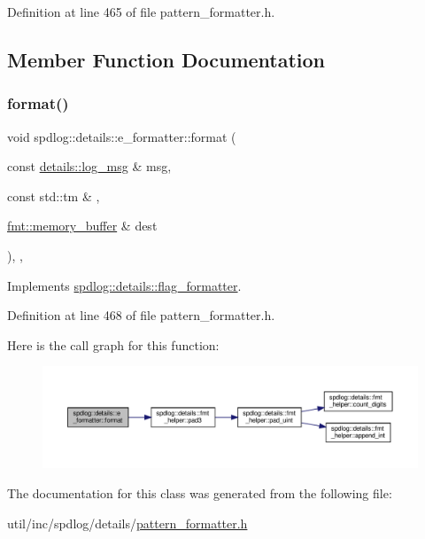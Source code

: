 Definition at line 465 of file pattern\+\_\+formatter.\+h.



\subsection{Member Function Documentation}
\mbox{\label{classspdlog_1_1details_1_1e__formatter_a931a5482cce50c580dd4e570fd27e976}} 
\subsubsection{\texorpdfstring{format()}{format()}}
{\footnotesize\ttfamily void spdlog\+::details\+::e\+\_\+formatter\+::format (\begin{DoxyParamCaption}\item[{const \hyperlink{structspdlog_1_1details_1_1log__msg}{details\+::log\+\_\+msg} \&}]{msg,  }\item[{const std\+::tm \&}]{,  }\item[{\hyperlink{format_8h_a21cbf729f69302f578e6db21c5e9e0d2}{fmt\+::memory\+\_\+buffer} \&}]{dest }\end{DoxyParamCaption})\hspace{0.3cm}{\ttfamily [inline]}, {\ttfamily [override]}, {\ttfamily [virtual]}}



Implements \hyperlink{classspdlog_1_1details_1_1flag__formatter_a33fb3e42a4c8200cceb833d92b53fb67}{spdlog\+::details\+::flag\+\_\+formatter}.



Definition at line 468 of file pattern\+\_\+formatter.\+h.

Here is the call graph for this function\+:
\nopagebreak
\begin{figure}[H]
\begin{center}
\leavevmode
\includegraphics[width=350pt]{classspdlog_1_1details_1_1e__formatter_a931a5482cce50c580dd4e570fd27e976_cgraph}
\end{center}
\end{figure}


The documentation for this class was generated from the following file\+:\begin{DoxyCompactItemize}
\item 
util/inc/spdlog/details/\hyperlink{pattern__formatter_8h}{pattern\+\_\+formatter.\+h}\end{DoxyCompactItemize}

